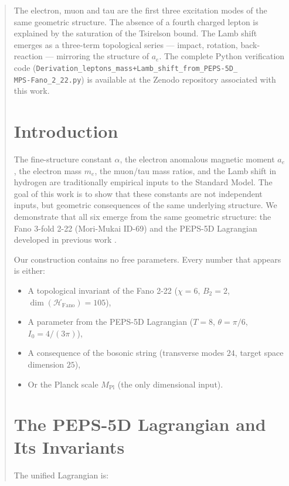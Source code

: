 \documentclass[12pt]{article}
\begin{document}
\begin{abstract}
\fussy
The electron, muon and tau are the first three excitation modes of the same 
geometric structure. The absence of a fourth charged lepton is explained by 
the saturation of the Tsirelson bound. The Lamb shift emerges as a three-term 
topological series — impact, rotation, back-reaction — mirroring the structure 
of \(a_e\). 
The complete Python verification code 
(\texttt{Derivation\_leptons\_mass+Lamb\_shift\_from\_PEPS-5D\_} \\
\texttt{MPS-Fano\_2\_22.py}) is available at the Zenodo repository 
associated with this work.

\tableofcontents

\newpage

\section{Introduction}

The fine-structure constant \(\alpha\), the electron anomalous magnetic moment \(a_e\), the electron mass \(m_e\), the muon/tau mass ratios, and the Lamb shift in hydrogen are traditionally empirical inputs to the Standard Model. The goal of this work is to show that these constants are not independent inputs, but geometric consequences of the same underlying structure. We demonstrate that all six emerge from the same geometric structure: the Fano 3-fold 2-22 (Mori-Mukai ID-69) and the PEPS-5D Lagrangian developed in previous work \cite{alpha_series, fano_series}.

Our construction contains no free parameters. Every number that appears is either:
\begin{itemize}
  \item A topological invariant of the Fano 2-22 (\(\chi=6\), \(B_2=2\), \(\dim(\mathcal{H}_{\text{Fano}})=105\)),
  \item A parameter from the PEPS-5D Lagrangian (\(T=8\), \(\theta=\pi/6\), \(I_0=4/(3\pi)\)),
  \item A consequence of the bosonic string (transverse modes \(24\), target space dimension \(25\)),
  \item Or the Planck scale \(M_{\text{Pl}}\) (the only dimensional input).
\end{itemize}

\section{The PEPS-5D Lagrangian and Its Invariants}

The unified Lagrangian is:


\end{abstract}
\end{document}
